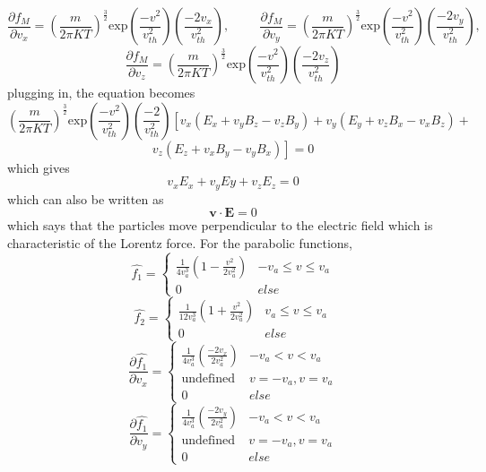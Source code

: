 \documentclass[12pt]{article}
\begin{document}
	$$\frac{\displaystyle \partial f_{M}}{\displaystyle \partial v_{x}} = \left(\frac{m}{2 \pi K T}\right)^{\frac{3}{2}}  \mathrm{exp} \left(\frac{-v^{2}}{v_{th}^{2}}\right)\left(\frac{-2 v_{x}}{v_{th}^{2}}\right)\mathrm{,} \hspace{1cm} \frac{\displaystyle \partial f_{M}}{\displaystyle \partial v_{y}} = \left(\frac{m}{2 \pi K T}\right)^{\frac{3}{2}}  \mathrm{exp} \left(\frac{-v^{2}}{v_{th}^{2}}\right)\left(\frac{-2 v_{y}}{v_{th}^{2}}\right) \mathrm{,}$$ $$\frac{\displaystyle \partial f_{M}}{\displaystyle \partial v_{z}} = \left(\frac{m}{2 \pi K T}\right)^{\frac{3}{2}}  \mathrm{exp} \left(\frac{-v^{2}}{v_{th}^{2}}\right)\left(\frac{-2 v_{z}}{v_{th}^{2}}\right)$$
	plugging in, the equation becomes
	$$\left(\frac{m}{2 \pi K T}\right)^{\frac{3}{2}}  \mathrm{exp} \left(\frac{-v^{2}}{v_{th}^{2}}\right)\left(\frac{-2}{v_{th}^{2}}\right) \left[v_{x}\left( E_{x} + v_{y} B_{z} - v_{z} B_{y} \right) + v_{y} \left( E_{y} + v_{z} B_{x} - v_{x} B_{z} \right) + \right.$$ $$\left. v_{z} \left(E_{z} + v_{x} B_{y} - v_{y} B_{x}\right) \right] = 0$$
	which gives
	$$v_{x} E_{x} + v_{y} E{y} + v_{z} E_{z} = 0$$
	which can also be written as 
	$$
		\label{eqn:MaxwellInVlasov}
		\boldsymbol{v} \cdot \mathrm{\mathbf{E}} = 0
	$$ 
	which says that the particles move perpendicular to the electric field which is characteristic of the Lorentz force.
	For the parabolic functions,
	\[ \hat{f_{1}} = 
	\begin{cases} 
		\frac{1}{4 v_{a}^{3}} \left(1 - \frac{v^{2}}{2 v_{a}^2}\right) & -v_{a}\leq v\leq v_{a} \\
		0 & else 
	\end{cases}
	\]
	\[ \hat{f_{2}} = 
	\begin{cases}
		\frac{1}{12 v_{a}^{3}} \left(1 + \frac{v^{2}}{2 v_{a}^2}\right) & v_{a}\leq v\leq v_{a} \\
		0 & else
	\end{cases}\] 
	\[ \frac{\displaystyle \partial \hat{f_{1}}}{\displaystyle \partial v_{x}} = 
	\begin{cases} 
		\frac{1}{4 v_{a}^{3}} \left(\frac{- 2 v_{x}}{2 v_{a}^2}\right) & -v_{a} < v < v_{a} \\
		\mathrm{undefined} & v = - v_{a}, v = v_{a} \\
		0 & else 
	\end{cases}
	\]
	\[ \frac{\displaystyle \partial \hat{f_{1}}}{\displaystyle \partial v_{y}} = 
	\begin{cases} 
		\frac{1}{4 v_{a}^{3}} \left(\frac{- 2 v_{y}}{2 v_{a}^2}\right) & -v_{a} < v < v_{a} \\
		\mathrm{undefined} & v = - v_{a}, v = v_{a} \\
		0 & else 
	\end{cases}
	\]
\end{document}
